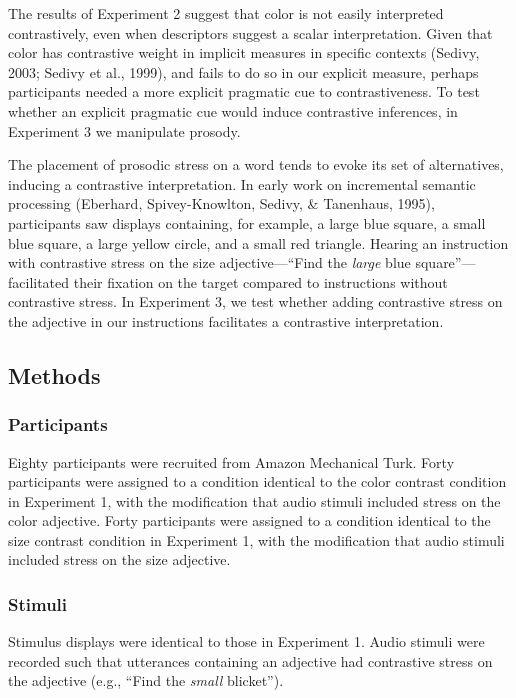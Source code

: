\documentclass[10pt, letterpaper]{article}
\begin{document}
The results of Experiment 2 suggest that color is not easily interpreted
contrastively, even when descriptors suggest a scalar interpretation.
Given that color has contrastive weight in implicit measures in specific
contexts (Sedivy, 2003; Sedivy et al., 1999), and fails to do so in our
explicit measure, perhaps participants needed a more explicit pragmatic
cue to contrastiveness. To test whether an explicit pragmatic cue would
induce contrastive inferences, in Experiment 3 we manipulate prosody.

The placement of prosodic stress on a word tends to evoke its set of
alternatives, inducing a contrastive interpretation. In early work on
incremental semantic processing (Eberhard, Spivey-Knowlton, Sedivy, \&
Tanenhaus, 1995), participants saw displays containing, for example, a
large blue square, a small blue square, a large yellow circle, and a
small red triangle. Hearing an instruction with contrastive stress on
the size adjective---``Find the \emph{large} blue square''---facilitated
their fixation on the target compared to instructions without
contrastive stress. In Experiment 3, we test whether adding contrastive
stress on the adjective in our instructions facilitates a contrastive
interpretation.

\subsection{Methods}\label{methods-1}

\subsubsection{Participants}\label{participants-1}

Eighty participants were recruited from Amazon Mechanical Turk. Forty
participants were assigned to a condition identical to the color
contrast condition in Experiment 1, with the modification that audio
stimuli included stress on the color adjective. Forty participants were
assigned to a condition identical to the size contrast condition in
Experiment 1, with the modification that audio stimuli included stress
on the size adjective.

\subsubsection{Stimuli}\label{stimuli-1}

Stimulus displays were identical to those in Experiment 1. Audio stimuli
were recorded such that utterances containing an adjective had
contrastive stress on the adjective (e.g., ``Find the \emph{small}
blicket'').
\end{document}
